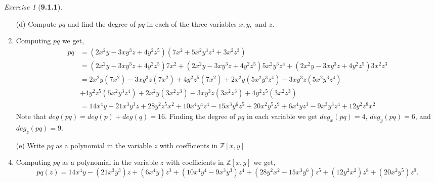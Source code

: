 \documentclass[12pt]{amsart}
\makeatletter
\theoremstyle{remark}
\newtheorem*{exercise}{Exercise}%
\def\ZZ{\ensuremath{\mathbb Z}}
\renewenvironment{proof}[1][\proofname]{\par\doublespacing
  \pushQED{\qed}%
  \normalfont \topsep6\p@\@plus6\p@\relax
  \list{}{%
    \settowidth{\leftmargin}{\itshape\proofname:\hskip\labelsep}%
    \setlength{\labelwidth}{0pt}%
    \setlength{\itemindent}{-\leftmargin}%
  }%
  \item[\hskip\labelsep\itshape#1\@addpunct{:}]\ignorespaces
}{%
  \popQED\endlist\@endpefalse
  \singlespacing
}
\theoremstyle{mycomment}
\makeatother
\begin{document}
\begin{exercise}[\textbf{9.1.1}]
\begin{enumerate}
      \item[(d)] Compute $pq$ and find the degree of $pq$ in each of the three variables $x, y,$ and $z$. 
      \begin{proof} Computing $pq$ we get, 
        \begin{align*}
          pq &= (2x^2y - 3xy^3z + 4y^2z^5)(7x^2 + 5x^2y^3z^4 + 3x^2z^3)\\
         &= (2x^2y - 3xy^3z + 4y^2z^5)7x^2 + (2x^2y - 3xy^3z + 4y^2z^5)5x^2y^3z^4 + (2x^2y - 3xy^3z + 4y^2z^5)3x^2z^3\\
         &= 2x^2y(7x^2) - 3xy^3z(7x^2) + 4y^2z^5(7x^2) + 2x^2y(5x^2y^3z^4) - 3xy^3z(5x^2y^3z^4) \\
         &+ 4y^2z^5(5x^2y^3z^4) + 2x^2y(3x^2z^3) - 3xy^3z(3x^2z^3) + 4y^2z^5(3x^2z^3)\\
         &= 14x^4y - 21x^3y^3z + 28y^2z^5x^2 + 10x^4y^4z^4 - 15x^3y^6z^5 + 20x^2y^5z^9 + 6x^4yz^3 - 9x^3y^3z^4 + 12y^2z^8x^2
        \end{align*}
        Note that $deg(pq) = deg(p) + deg(q) = 16$. Finding the degree of $pq$ in each variable we get $deg_x(pq) = 4$, $deg_y(pq) = 6$, and $deg_z(pq) = 9$.
        \end{proof}
        \vspace{.15in}

      \item[(e)] Write $pq$ as a polynomial in the variable $z$ with coefficients in $\ZZ[x, y]$
      \begin{proof} Computing $pq$ as a polynomial in the variable $z$ with coefficients in $\ZZ[x, y]$ we get, 
        \begin{equation*}
          pq(z) = 14x^4y - (21x^3y^3)z + (6x^4y)z^3 + (10x^4y^4- 9x^3y^3)z^4 + (28y^2x^2 - 15x^3y^6)z^5 + (12y^2x^2)z^8 + (20x^2y^5)z^9. 
        \end{equation*}
        \end{proof}
  \end{enumerate}
\end{exercise}
\vspace{.5in}
\end{document}
